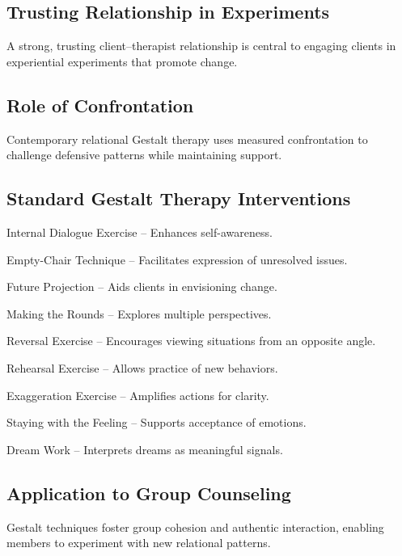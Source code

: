 \subsection{Trusting Relationship in Experiments}
\begin{coloredlist}
    \item A strong, trusting client–therapist relationship is central to engaging clients in experiential experiments that promote change.
\end{coloredlist}

\subsection{Role of Confrontation}
\begin{coloredlist}
    \item Contemporary relational Gestalt therapy uses measured confrontation to challenge defensive patterns while maintaining support.
\end{coloredlist}

\subsection{Standard Gestalt Therapy Interventions}
\begin{coloredlist}
    \item Internal Dialogue Exercise – Enhances self-awareness.
    \item Empty-Chair Technique – Facilitates expression of unresolved issues.
    \item Future Projection – Aids clients in envisioning change.
    \item Making the Rounds – Explores multiple perspectives.
    \item Reversal Exercise – Encourages viewing situations from an opposite angle.
    \item Rehearsal Exercise – Allows practice of new behaviors.
    \item Exaggeration Exercise – Amplifies actions for clarity.
    \item Staying with the Feeling – Supports acceptance of emotions.
    \item Dream Work – Interprets dreams as meaningful signals.
\end{coloredlist}

\subsection{Application to Group Counseling}
\begin{coloredlist}
    \item Gestalt techniques foster group cohesion and authentic interaction, enabling members to experiment with new relational patterns.
\end{coloredlist}

